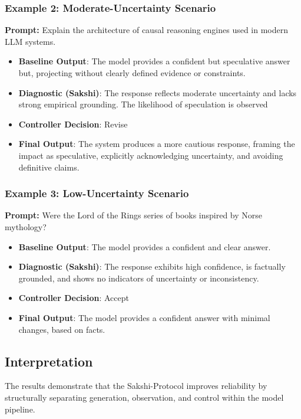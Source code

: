 \documentclass[12pt,a4paper]{article}
\begin{document}
\subsubsection*{Example 2: Moderate-Uncertainty Scenario}
\textbf{Prompt:} Explain the architecture of causal reasoning engines used in modern LLM systems.

\begin{itemize}
    \item \textbf{Baseline Output}: The model provides a confident but speculative answer but, projecting without clearly defined evidence or constraints.
    \item \textbf{Diagnostic (Sakshi)}: The response reflects moderate uncertainty and lacks strong empirical grounding. The likelihood of speculation is observed
    \item \textbf{Controller Decision}: Revise
    \item \textbf{Final Output}: The system produces a more cautious response, framing the impact as speculative, explicitly acknowledging uncertainty, and avoiding definitive claims.
\end{itemize}

\subsubsection*{Example 3: Low-Uncertainty Scenario}
\textbf{Prompt:} Were the Lord of the Rings series of books inspired by Norse mythology?

\begin{itemize}
    \item \textbf{Baseline Output}: The model provides a confident and clear answer.
    \item \textbf{Diagnostic (Sakshi)}: The response exhibits high confidence, is factually grounded, and shows no indicators of uncertainty or inconsistency.
    \item \textbf{Controller Decision}: Accept
    \item \textbf{Final Output}: The model provides a confident answer with minimal changes, based on facts.
\end{itemize}

\subsection{Interpretation}

The results demonstrate that the Sakshi-Protocol improves reliability by structurally separating generation, observation, and control within the model pipeline.
\end{document}
